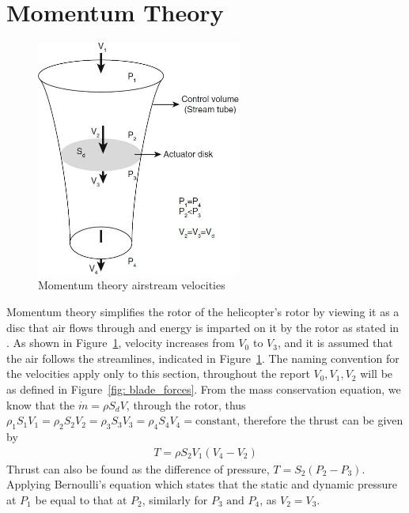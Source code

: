     \section{Momentum Theory}
        \begin{figure}[h]
            \centering
            \includegraphics[width =0.6\textwidth]{figs/Literature Review/Momentum_theory.png}
            \caption{Momentum theory airstream velocities}
            \label{fig: mometum_theory}
        \end{figure}
        Momentum theory simplifies the rotor of the helicopter's rotor by viewing it as a disc that air flows through and energy is imparted on it by the rotor as stated in  \cite{AflredAerodynamicsOfHelicopters}. As shown in Figure~\ref{fig: mometum_theory}, velocity increases from \(V_0\) to \(V_3\), and it is assumed that the air follows the streamlines, indicated in Figure~\ref{fig: mometum_theory}. The naming convention for the velocities apply only to this section, throughout the report \(V_0,V_1,V_2\) will be as defined in Figure~\ref{fig: blade_forces}. From the mass conservation equation, we know that the \(\dot{m} = \rho S_d V\), through the rotor, thus \(\rho_1 S_1 V_1 = \rho_2 S_2 V_2 = \rho_3 S_3 V_3 =  \rho_4 S_4 V_4 = \text{constant} \), therefore the thrust can be given by
        \begin{align}
            T = \rho S_2 V_1(V_4-V_2) \label{eq: thrust_1}
        \end{align}
         Thrust can also be found as the difference of pressure, \(T=S_2(P_2-P_3)\). Applying Bernoulli's equation which states that the static and dynamic pressure at \(P_1\) be equal to that at \(P_2\), similarly for  \(P_3 \text{ and } P_4\), as \(V_2=V_3\).
